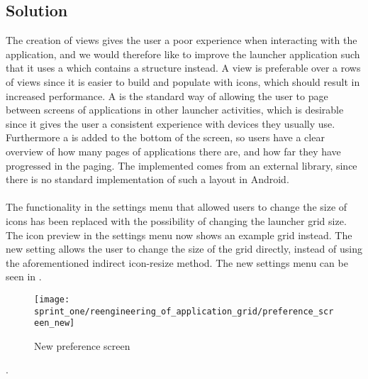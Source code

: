 \subsection{Solution}
\label{sub:reengineering_of_application_grid_solution}
The creation of  views gives the user a poor experience when interacting with the application, and we would therefore like to improve the launcher application such that it uses a  which contains a  structure instead. A  view is preferable over a rows of  views since it is easier to build and populate with icons, which should result in increased performance. A  is the standard way of allowing the user to page between screens of applications in other launcher activities, which is desirable since it gives the user a consistent experience with devices they usually use. Furthermore a  is added to the bottom of the screen, so users have a clear overview of how many pages of applications there are, and how far they have progressed in the paging. The implemented  comes from an external library\parencite{view_pager_indicator_avianey}, since there is no standard implementation of such a layout in Android.
\\\\
The functionality in the settings menu that allowed users to change the size of icons has been replaced with the possibility of changing the launcher grid size. The icon preview in the settings menu now shows an example grid instead. The new setting allows the user to change the size of the grid directly, instead of using the aforementioned indirect icon-resize method. The new settings menu can be seen in .

\begin{figure}[!htbp]
    \centering
    \texttt{[image: sprint\_one/reengineering\_of\_application\_grid/preference\_screen\_new]}
    \caption{New preference screen}
    \label{fig:preference_screen_new}
\end{figure}.